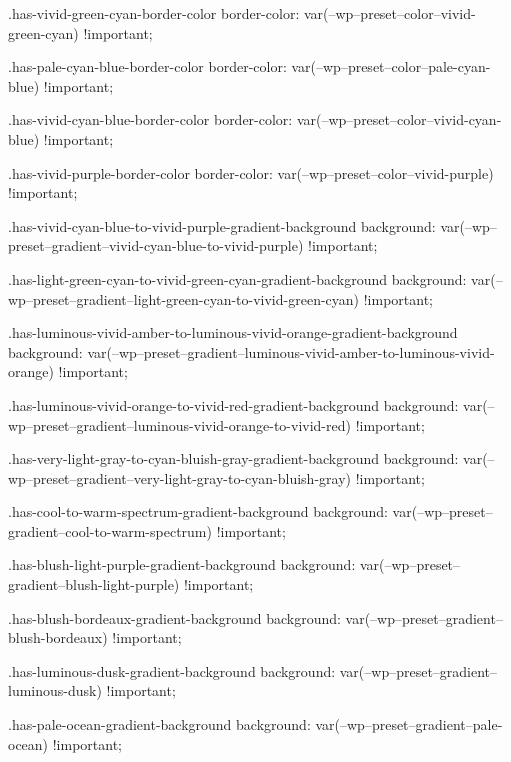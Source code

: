         .has-vivid-green-cyan-border-color {
            border-color: var(--wp--preset--color--vivid-green-cyan) !important;
        }

        .has-pale-cyan-blue-border-color {
            border-color: var(--wp--preset--color--pale-cyan-blue) !important;
        }

        .has-vivid-cyan-blue-border-color {
            border-color: var(--wp--preset--color--vivid-cyan-blue) !important;
        }

        .has-vivid-purple-border-color {
            border-color: var(--wp--preset--color--vivid-purple) !important;
        }

        .has-vivid-cyan-blue-to-vivid-purple-gradient-background {
            background: var(--wp--preset--gradient--vivid-cyan-blue-to-vivid-purple) !important;
        }

        .has-light-green-cyan-to-vivid-green-cyan-gradient-background {
            background: var(--wp--preset--gradient--light-green-cyan-to-vivid-green-cyan) !important;
        }

        .has-luminous-vivid-amber-to-luminous-vivid-orange-gradient-background {
            background: var(--wp--preset--gradient--luminous-vivid-amber-to-luminous-vivid-orange) !important;
        }

        .has-luminous-vivid-orange-to-vivid-red-gradient-background {
            background: var(--wp--preset--gradient--luminous-vivid-orange-to-vivid-red) !important;
        }

        .has-very-light-gray-to-cyan-bluish-gray-gradient-background {
            background: var(--wp--preset--gradient--very-light-gray-to-cyan-bluish-gray) !important;
        }

        .has-cool-to-warm-spectrum-gradient-background {
            background: var(--wp--preset--gradient--cool-to-warm-spectrum) !important;
        }

        .has-blush-light-purple-gradient-background {
            background: var(--wp--preset--gradient--blush-light-purple) !important;
        }

        .has-blush-bordeaux-gradient-background {
            background: var(--wp--preset--gradient--blush-bordeaux) !important;
        }

        .has-luminous-dusk-gradient-background {
            background: var(--wp--preset--gradient--luminous-dusk) !important;
        }

        .has-pale-ocean-gradient-background {
            background: var(--wp--preset--gradient--pale-ocean) !important;
        }


